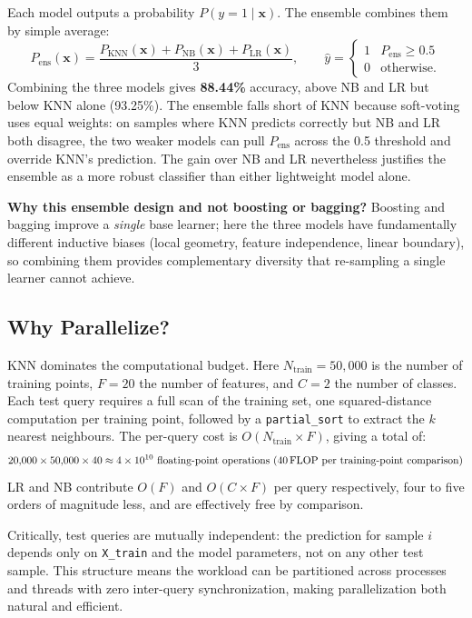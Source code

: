 \documentclass[12pt,a4paper]{article}
\begin{document}
Each model outputs a probability $P(y{=}1 \mid \mathbf{x})$. The ensemble
combines them by simple average:
\[
  P_\text{ens}(\mathbf{x}) = \frac{P_\text{KNN}(\mathbf{x}) +
                                    P_\text{NB}(\mathbf{x}) +
                                    P_\text{LR}(\mathbf{x})}{3},
  \qquad
  \hat{y} = \begin{cases} 1 & P_\text{ens} \geq 0.5 \\ 0 & \text{otherwise.}
             \end{cases}
\]
Combining the three models gives \textbf{88.44\%} accuracy, above NB and LR
but below KNN alone (93.25\%). The ensemble falls short of KNN because
soft-voting uses equal weights: on samples where KNN predicts correctly but
NB and LR both disagree, the two weaker models can pull
$P_\text{ens}$ across the 0.5 threshold and override KNN's prediction.
The gain over NB and LR nevertheless justifies the ensemble as a more
robust classifier than either lightweight model alone.

\textbf{Why this ensemble design and not boosting or bagging?}
Boosting and bagging improve a \emph{single} base learner; here the three
models have fundamentally different inductive biases (local geometry,
feature independence, linear boundary), so combining them provides
complementary diversity that re-sampling a single learner cannot achieve.

\subsection{Why Parallelize?}

KNN dominates the computational budget. Here $N_\text{train} = 50{,}000$
is the number of training points, $F = 20$ the number of features, and
$C = 2$ the number of classes. Each test query requires a full scan of the
training set, one squared-distance computation per training point,
followed by a \texttt{partial\_sort} to extract the $k$ nearest neighbours.
The per-query cost is $O(N_\text{train} \times F)$, giving a total of:
%
\[
  20{,}000 \times 50{,}000 \times 40 \approx 4 \times 10^{10}
  \text{ floating-point operations (40\,FLOP per training-point comparison)}
\]
%
LR and NB contribute $O(F)$ and $O(C \times F)$ per query respectively, four to five orders of magnitude
less, and are effectively free by comparison.

Critically, test queries are mutually independent: the prediction for sample
$i$ depends only on \texttt{X\_train} and the model parameters, not on any
other test sample. This structure means the workload
can be partitioned across processes and threads with zero inter-query
synchronization, making parallelization both natural and efficient.
\end{document}
